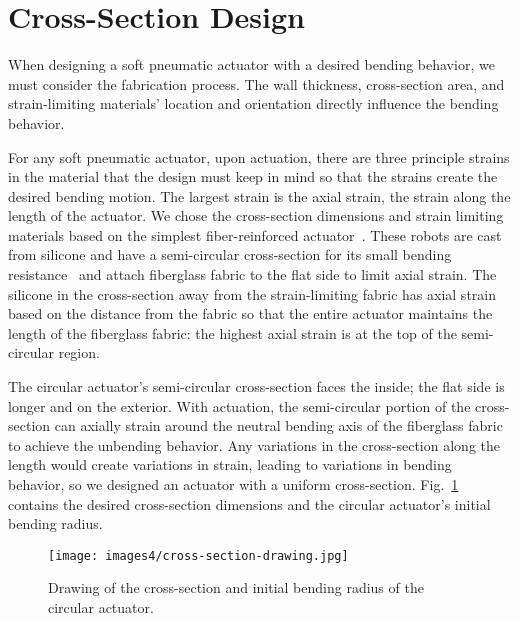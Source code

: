 \section{Cross-Section Design}

When designing a soft pneumatic actuator with a desired bending behavior, we must consider the fabrication process. The wall thickness, cross-section area, and strain-limiting materials' location and orientation directly influence the bending behavior. 

For any soft pneumatic actuator, upon actuation, there are three principle strains in the material that the design must keep in mind so that the strains create the desired bending motion. The largest strain is the axial strain, the strain along the length of the actuator. We chose the cross-section dimensions and strain limiting materials based on the simplest fiber-reinforced actuator~\cite{galloway_mechanically_2013}. These robots are cast from silicone and have a semi-circular cross-section for its small bending resistance~\cite{polygerinos_modeling_2015} and attach fiberglass fabric to the flat side to limit axial strain. The silicone in the cross-section away from the strain-limiting fabric has axial strain based on the distance from the fabric so that the entire actuator maintains the length of the fiberglass fabric: the highest axial strain is at the top of the semi-circular region.  

The circular actuator's semi-circular cross-section faces the inside; the flat side is longer and on the exterior. With actuation, the semi-circular portion of the cross-section can axially strain around the neutral bending axis of the fiberglass fabric to achieve the unbending behavior. Any variations in the cross-section along the length would create variations in strain, leading to variations in bending behavior, so we designed an actuator with a uniform cross-section. Fig.~\ref{fig:crosssection} contains the desired cross-section dimensions and the circular actuator's initial bending radius. 

\begin{figure}[!ht]
    \centering
    \texttt{[image: images4/cross-section-drawing.jpg]}
    \caption{Drawing of the cross-section and initial bending radius of the circular actuator.}
    \label{fig:crosssection}
\end{figure}